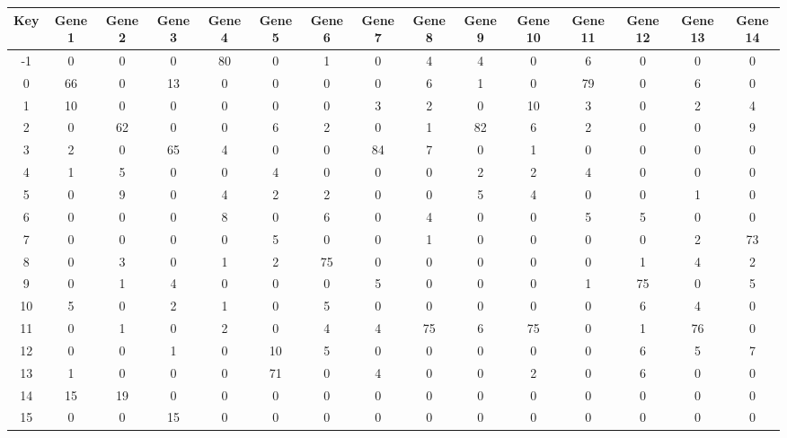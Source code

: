\begin{tabular}{|c|c|c|c|c|c|c|c|c|c|c|c|c|c|c|}
\hline
Key & Gene 1 & Gene 2 & Gene 3 & Gene 4 & Gene 5 & Gene 6 & Gene 7 & Gene 8 & Gene 9 & Gene 10 & Gene 11 & Gene 12 & Gene 13 & Gene 14 \\
\hline
-1 & 0 & 0 & 0 & 80 & 0 & 1 & 0 & 4 & 4 & 0 & 6 & 0 & 0 & 0 \\
0 & 66 & 0 & 13 & 0 & 0 & 0 & 0 & 6 & 1 & 0 & 79 & 0 & 6 & 0 \\
1 & 10 & 0 & 0 & 0 & 0 & 0 & 3 & 2 & 0 & 10 & 3 & 0 & 2 & 4 \\
2 & 0 & 62 & 0 & 0 & 6 & 2 & 0 & 1 & 82 & 6 & 2 & 0 & 0 & 9 \\
3 & 2 & 0 & 65 & 4 & 0 & 0 & 84 & 7 & 0 & 1 & 0 & 0 & 0 & 0 \\
4 & 1 & 5 & 0 & 0 & 4 & 0 & 0 & 0 & 2 & 2 & 4 & 0 & 0 & 0 \\
5 & 0 & 9 & 0 & 4 & 2 & 2 & 0 & 0 & 5 & 4 & 0 & 0 & 1 & 0 \\
6 & 0 & 0 & 0 & 8 & 0 & 6 & 0 & 4 & 0 & 0 & 5 & 5 & 0 & 0 \\
7 & 0 & 0 & 0 & 0 & 5 & 0 & 0 & 1 & 0 & 0 & 0 & 0 & 2 & 73 \\
8 & 0 & 3 & 0 & 1 & 2 & 75 & 0 & 0 & 0 & 0 & 0 & 1 & 4 & 2 \\
9 & 0 & 1 & 4 & 0 & 0 & 0 & 5 & 0 & 0 & 0 & 1 & 75 & 0 & 5 \\
10 & 5 & 0 & 2 & 1 & 0 & 5 & 0 & 0 & 0 & 0 & 0 & 6 & 4 & 0 \\
11 & 0 & 1 & 0 & 2 & 0 & 4 & 4 & 75 & 6 & 75 & 0 & 1 & 76 & 0 \\
12 & 0 & 0 & 1 & 0 & 10 & 5 & 0 & 0 & 0 & 0 & 0 & 6 & 5 & 7 \\
13 & 1 & 0 & 0 & 0 & 71 & 0 & 4 & 0 & 0 & 2 & 0 & 6 & 0 & 0 \\
14 & 15 & 19 & 0 & 0 & 0 & 0 & 0 & 0 & 0 & 0 & 0 & 0 & 0 & 0 \\
15 & 0 & 0 & 15 & 0 & 0 & 0 & 0 & 0 & 0 & 0 & 0 & 0 & 0 & 0 \\
\hline
\end{tabular}